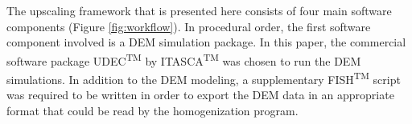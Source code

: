 The upscaling framework that is presented here consists of four main software components (Figure \ref{fig:workflow}). In procedural order, the first software component involved is a DEM simulation package. In this paper, the commercial software package UDEC\textsuperscript{TM} by ITASCA\textsuperscript{TM} was chosen to run the DEM simulations. In addition to the DEM modeling, a supplementary FISH\textsuperscript{TM} script was required to be written in order to export the DEM data in an appropriate format that could be read by the homogenization program. 

